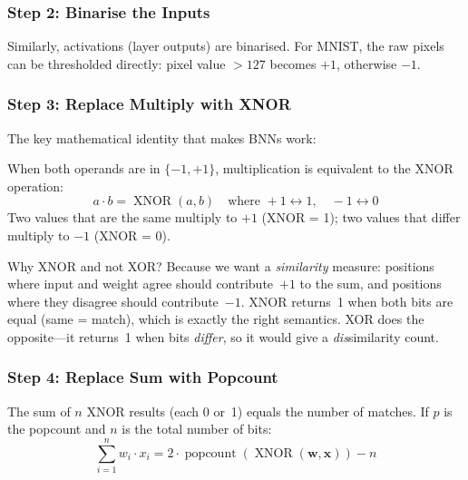 \subsubsection{Step 2: Binarise the Inputs}

Similarly, activations (layer outputs) are binarised. For MNIST, the
raw pixels can be thresholded directly: pixel value $> 127$ becomes
$+1$, otherwise $-1$.

\subsubsection{Step 3: Replace Multiply with XNOR}

The key mathematical identity that makes BNNs work:

\begin{keyinsight}
When both operands are in $\{-1, +1\}$, multiplication is equivalent
to the XNOR operation:
\[
  a \cdot b = \operatorname{XNOR}(a, b) \quad
  \text{where } +1 \leftrightarrow 1, \quad -1 \leftrightarrow 0
\]
Two values that are the same multiply to $+1$ (XNOR = 1); two
values that differ multiply to $-1$ (XNOR = 0).

Why XNOR and not XOR? Because we want a \emph{similarity} measure:
positions where input and weight agree should contribute~$+1$ to the
sum, and positions where they disagree should contribute~$-1$. XNOR
returns~1 when both bits are equal (same = match), which is exactly
the right semantics. XOR does the opposite---it returns~1 when bits
\emph{differ}, so it would give a \emph{dis}similarity count.
\end{keyinsight}

\subsubsection{Step 4: Replace Sum with Popcount}

The sum of $n$ XNOR results (each 0 or~1) equals the number of
matches. If $p$ is the popcount and $n$ is the total number of bits:
\begin{equation}
  \sum_{i=1}^{n} w_i \cdot x_i = 2 \cdot \operatorname{popcount}
    (\operatorname{XNOR}(\bm{w}, \bm{x})) - n
  \label{eq:xnor-popcount}
\end{equation}

